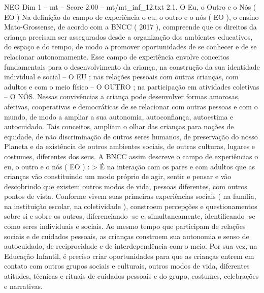 \begin{textsample}{NEG Dim 1 – mt – Score 2.00 – mt/mt\_inf\_12.txt}  \label{ex:f1_neg_213}
2.1.
O Eu, o Outro e o Nós ( EO ) Na definição do campo de experiência o eu, o outro e o nós ( EO ), o ensino Mato-Grossense, de acordo com a BNCC ( 2017 ), compreende que os direitos da criança precisam ser assegurados desde a organização dos ambientes educativos, do espaço e do tempo, de modo a promover oportunidades de se conhecer e de se relacionar autonomamente.
Esse campo de experiência envolve conceitos fundamentais para o desenvolvimento da criança, na construção da sua identidade individual e social – O EU ; nas relações pessoais com outras crianças, com adultos e com o meio físico – O OUTRO ; na participação em atividades coletivas – O NÓS.
Nessas convivências a criança pode desenvolver formas amorosas, afetivas, cooperativas e democráticas de se relacionar com outras pessoas e com o mundo, de modo a ampliar a sua autonomia, autoconfiança, autoestima e autocuidado.
Tais conceitos, ampliam o olhar das crianças para noções de equidade, de não discriminação de outros seres humanos, de preservação do nosso Planeta e da existência de outros ambientes sociais, de outras culturas, lugares e costumes, diferentes dos seus.
A BNCC assim descreve o campo de experiências o eu, o outro e o nós ( EO ) : > É na interação com os pares e com adultos que as crianças vão constituindo um modo próprio de agir, sentir e pensar e vão descobrindo que existem outros modos de vida, pessoas diferentes, com outros pontos de vista.
Conforme vivem suas primeiras experiências sociais ( na família, na instituição escolar, na coletividade ), constroem percepções e questionamentos sobre si e sobre os outros, diferenciando -se e, simultaneamente, identificando -se como seres individuais e sociais.
Ao mesmo tempo que participam de relações sociais e de cuidados pessoais, as crianças constroem sua autonomia e senso de autocuidado, de reciprocidade e de interdependência com o meio.
Por sua vez, na Educação Infantil, é preciso criar oportunidades para que as crianças entrem em contato com outros grupos sociais e culturais, outros modos de vida, diferentes atitudes, técnicas e rituais de cuidados pessoais e do grupo, costumes, celebrações e narrativas.

\end{textsample}
